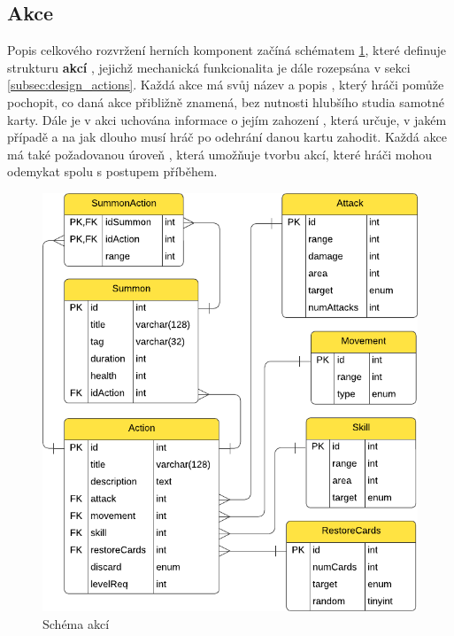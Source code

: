 \subsection{Akce}
\label{subsec:schema_actions}

Popis celkového rozvržení herních komponent začíná schématem \ref{diag:er_action}, které definuje strukturu \textbf{akcí} , jejichž mechanická funkcionalita je dále rozepsána v sekci \ref{subsec:design_actions}. Každá akce má svůj název  a popis , který hráči pomůže pochopit, co daná akce přibližně znamená, bez nutnosti hlubšího studia samotné karty. Dále je v akci uchována informace o jejím zahození , která určuje, v jakém případě a na jak dlouho musí hráč po odehrání danou kartu zahodit. Každá akce má také požadovanou úroveň , která umožňuje tvorbu akcí, které hráči mohou odemykat spolu s postupem příběhem.

\begin{figure}[h]
    \centering
    \includegraphics{../../shared/diagrams/er_action.pdf}
    \caption{Schéma akcí}
    \label{diag:er_action}
\end{figure}

